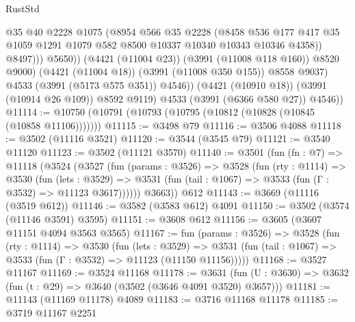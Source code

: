 \begin{lexlean}{RustStd}
\begin{coremodule}
                            @35
                            @40
                            @2228
                            @1075
                            (@8954
                              @566
                              @35
                              @2228
                              (@8458
                                @536
                                @177
                                @417
                                @35
                                @1059
                                @1291
                                @1079
                                @582
                                @8500
                                @10337
                                @10340
                                @10343
                                @10346
                                @4358))
                            @8497)))
                      @5650))
                  (@4421 (@11004 @23))
                  (@3991 (@11008 @118 @160))
                  @8520
                  @9000)
                (@4421 (@11004 @18))
                (@3991 (@11008 @350 @155))
                @8558
                @9037)
              @4533
              (@3991 (@5173 @575 @351))
              @4546))
          (@4421 (@10910 @18))
          (@3991 (@10914 @26 @109))
          @8592
          @9119)
        @4533
        (@3991 (@6366 @580 @27))
        @4546))
@11114 := @10750 (@10791 (@10793 (@10795 (@10812 (@10828 (@10845 (@10858 @11106)))))))
@11115 := @3498 @79
@11116 := @3506 @4088
@11118 := @3502 (@11116 @3521)
@11120 := @3544 (@3545 @79)
@11121 := @3540 @11120
@11123 := @3502 (@11121 @3570)
@11140 := @3501
    (fun (fn : @7) =>
    @11118
      (@3524
        (@3527
          (fun (params : @3526) =>
          @3528
            (fun (rty : @1114) =>
            @3530
              (fun (lets : @3529) =>
              @3531 (fun (tail : @1067) => @3533 (fun (Γ : @3532) => @11123 @3617))))))
        @3663))
    @612
@11143 := @3669 (@11116 (@3519 @612))
@11146 := @3582 (@3583 @612) @4091
@11150 := @3502 (@3574 (@11146 @3591) @3595)
@11151 := @3608 @612
@11156 := @3605 (@3607 @11151 @4094 @3563 @3565)
@11167 := fun (params : @3526) =>
  @3528
    (fun (rty : @1114) =>
    @3530
      (fun (lets : @3529) =>
      @3531 (fun (tail : @1067) => @3533 (fun (Γ : @3532) => @11123 (@11150 @11156)))))
@11168 := @3527 @11167
@11169 := @3524 @11168
@11178 := @3631
    (fun (U : @3630) => @3632 (fun (t : @29) => @3640 (@3502 (@3646 @4091 @3520) @3657)))
@11181 := @11143 (@11169 @11178) @4089
@11183 := @3716 @11168 @11178
@11185 := @3719 @11167 @2251

\end{coremodule}
\end{lexlean}
